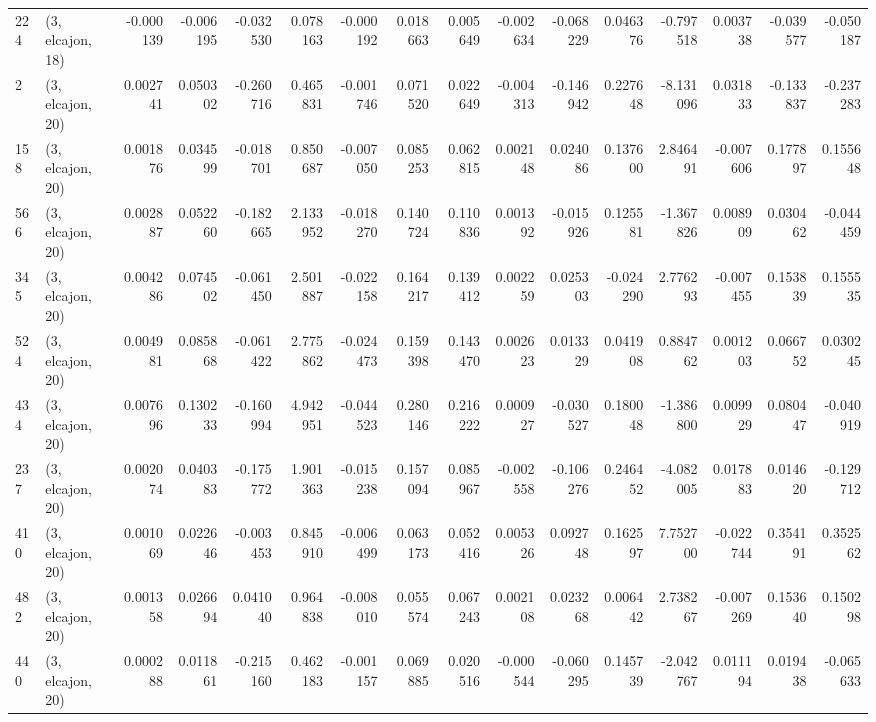 \begin{tabular}{llrrrrrrrrrrrrrr}
224 &  (3, elcajon, 18) &  -0.000139 & -0.006195 & -0.032530 &    0.078163 & -0.000192 &   0.018663 &  0.005649 & -0.002634 & -0.068229 &  0.046376 &   -0.797518 &  0.003738 & -0.039577 & -0.050187 \\
2   &  (3, elcajon, 20) &   0.002741 &  0.050302 & -0.260716 &    0.465831 & -0.001746 &   0.071520 &  0.022649 & -0.004313 & -0.146942 &  0.227648 &   -8.131096 &  0.031833 & -0.133837 & -0.237283 \\
158 &  (3, elcajon, 20) &   0.001876 &  0.034599 & -0.018701 &    0.850687 & -0.007050 &   0.085253 &  0.062815 &  0.002148 &  0.024086 &  0.137600 &    2.846491 & -0.007606 &  0.177897 &  0.155648 \\
566 &  (3, elcajon, 20) &   0.002887 &  0.052260 & -0.182665 &    2.133952 & -0.018270 &   0.140724 &  0.110836 &  0.001392 & -0.015926 &  0.125581 &   -1.367826 &  0.008909 &  0.030462 & -0.044459 \\
345 &  (3, elcajon, 20) &   0.004286 &  0.074502 & -0.061450 &    2.501887 & -0.022158 &   0.164217 &  0.139412 &  0.002259 &  0.025303 & -0.024290 &    2.776293 & -0.007455 &  0.153839 &  0.155535 \\
524 &  (3, elcajon, 20) &   0.004981 &  0.085868 & -0.061422 &    2.775862 & -0.024473 &   0.159398 &  0.143470 &  0.002623 &  0.013329 &  0.041908 &    0.884762 &  0.001203 &  0.066752 &  0.030245 \\
434 &  (3, elcajon, 20) &   0.007696 &  0.130233 & -0.160994 &    4.942951 & -0.044523 &   0.280146 &  0.216222 &  0.000927 & -0.030527 &  0.180048 &   -1.386800 &  0.009929 &  0.080447 & -0.040919 \\
237 &  (3, elcajon, 20) &   0.002074 &  0.040383 & -0.175772 &    1.901363 & -0.015238 &   0.157094 &  0.085967 & -0.002558 & -0.106276 &  0.246452 &   -4.082005 &  0.017883 &  0.014620 & -0.129712 \\
410 &  (3, elcajon, 20) &   0.001069 &  0.022646 & -0.003453 &    0.845910 & -0.006499 &   0.063173 &  0.052416 &  0.005326 &  0.092748 &  0.162597 &    7.752700 & -0.022744 &  0.354191 &  0.352562 \\
482 &  (3, elcajon, 20) &   0.001358 &  0.026694 &  0.041040 &    0.964838 & -0.008010 &   0.055574 &  0.067243 &  0.002108 &  0.023268 &  0.006442 &    2.738267 & -0.007269 &  0.153640 &  0.150298 \\
440 &  (3, elcajon, 20) &   0.000288 &  0.011861 & -0.215160 &    0.462183 & -0.001157 &   0.069885 &  0.020516 & -0.000544 & -0.060295 &  0.145739 &   -2.042767 &  0.011194 &  0.019438 & -0.065633 \\

\end{tabular}
